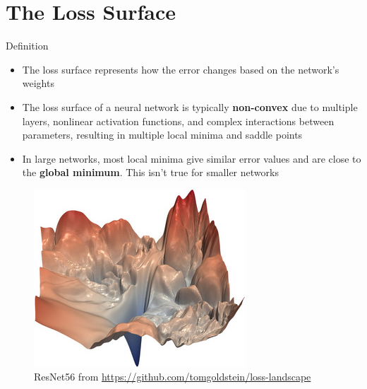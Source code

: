 \documentclass[serif, aspectratio=169]{beamer}
\begin{document}
\section{The Loss Surface}
\begin{frame}{Definition}
\begin{minipage}{0.5\linewidth}
    \begin{itemize}
        \item The loss surface represents how the error changes based on the network's weights
        \item The loss surface of a neural network is typically \textbf{non-convex} due to multiple layers, nonlinear activation functions, and complex interactions between parameters, resulting in multiple local minima and saddle points
        \item In large networks, most local minima give similar error values and are close to the \textbf{global minimum}. This isn't true for smaller networks
    \end{itemize}
\end{minipage}%
\begin{minipage}{0.5\linewidth}
    \begin{figure}[h]
        \centering
        \includegraphics[height=.5\textheight]{pic/resnet56_noshort_small.jpg}
        \caption{ResNet56 from \url{https://github.com/tomgoldstein/loss-landscape}}
        \end{figure}
\end{minipage}
\end{frame}
\end{document}
